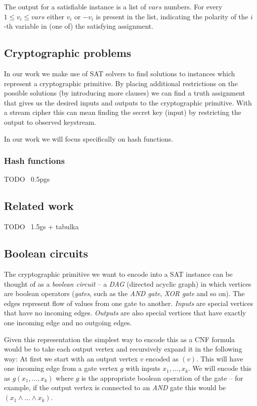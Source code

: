The output for a satisfiable instance is a list of $vars$ numbers.
For every $1 \le v_i \le vars$ either $v_i$ or $-v_i$ is present in the list, indicating the polarity of the $i$-th variable in (one of) the satisfying assignment. 

\subsection{Cryptographic problems}
In our work we make use of SAT solvers to find solutions to instances which represent a cryptographic primitive.
By placing additional restrictions on the possible solutions (by introducing more clauses) we can find a truth assignment that gives us the desired inputs and outputs to the cryptographic primitive.
With a stream cipher this can mean finding the secret key (input) by restricting the output to observed keystream.

In our work we will focus specifically on hash functions.

\subsubsection{Hash functions}
TODO ~0.5pgs

\subsection{Related work}
TODO ~1.5gs + tabulka

\subsection{Boolean circuits}
The cryptographic primitive we want to encode into a SAT instance can be thought of as a \emph{boolean circuit} -- a \emph{DAG} (directed acyclic graph) in which vertices are boolean operators (\emph{gates}, such as the \emph{AND gate}, \emph{XOR gate} and so on).
The edges represent flow of values from one gate to another.
\emph{Inputs} are special vertices that have no incoming edges.
\emph{Outputs} are also special vertices that have exactly one incoming edge and no outgoing edges.

Given this representation the simplest way to encode this as a CNF formula would be to take each output vertex and recursively expand it in the following way:
At first we start with an output vertex $v$ encoded as $(v)$.
This will have one incoming edge from a gate vertex $g$ with inputs $x_1, \dots, x_k$.
We will encode this as $g(x_1, \dots, x_k)$ where $g$ is the appropriate boolean operation of the gate -- for example, if the output vertex is connected to an \emph{AND} gate this would be $(x_1 \land \dots \land x_k)$.

